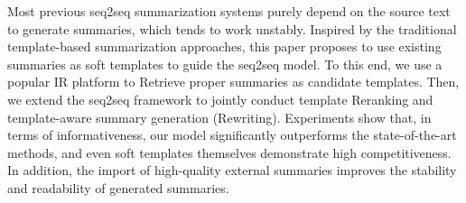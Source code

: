 Most previous seq2seq summarization systems purely depend on the source text to generate summaries, which tends to work unstably. Inspired by the traditional template-based summarization approaches, this paper proposes to use existing summaries as soft templates to guide the seq2seq model. To this end, we use a popular IR platform to Retrieve proper summaries as candidate templates. Then, we extend the seq2seq framework to jointly conduct template Reranking and template-aware summary generation (Rewriting). Experiments show that, in terms of informativeness, our model significantly outperforms the state-of-the-art methods, and even soft templates themselves demonstrate high competitiveness. In addition, the import of high-quality external summaries improves the stability and readability of generated summaries.
